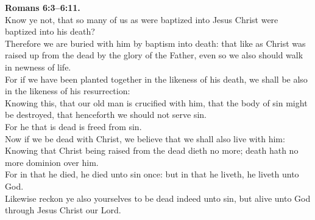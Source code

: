 \documentclass[10pt]{article} %
\begin{document}
{\begin{minipage}[t]{0.45\textwidth}
\textbf{Romans 6:3--6:11.}\\
Know ye not, that so many of us as were baptized into Jesus Christ were baptized into his death?\\
Therefore we are buried with him by baptism into death: that like as Christ was raised up from the dead by the glory of the Father, even so we also should walk in newness of life.\\
For if we have been planted together in the likeness of his death, we shall be also in the likeness of his resurrection:\\
Knowing this, that our old man is crucified with him, that the body of sin might be destroyed, that henceforth we should not serve sin.\\
For he that is dead is freed from sin.\\
Now if we be dead with Christ, we believe that we shall also live with him:\\
Knowing that Christ being raised from the dead dieth no more; death hath no more dominion over him.\\
For in that he died, he died unto sin once: but in that he liveth, he liveth unto God.\\
Likewise reckon ye also yourselves to be dead indeed unto sin, but alive unto God through Jesus Christ our Lord.\\

\end{minipage}}
\vspace*{\fill}
\newpage
\Huge%
\vspace*{\fill}
\begin{spacing}{1.0}%
\end{spacing}
\vspace*{\fill}
\end{document}
